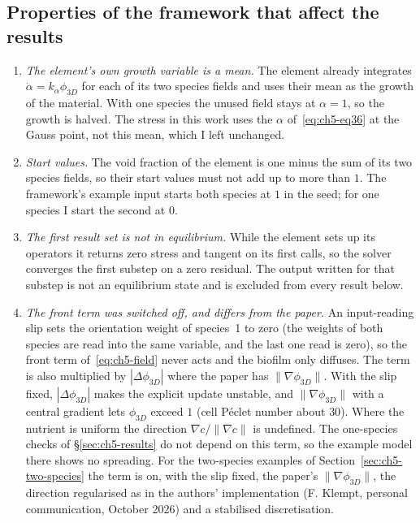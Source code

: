 \subsection{Properties of the framework that affect the results}
\begin{enumerate}
\item \emph{The element's own growth variable is a mean.} The element already
      integrates $\dot\alpha=k_\alpha\phi_{3D}$ for each of its two species fields
      and uses their mean as the growth of the material. With one species the
      unused field stays at $\alpha=1$, so the growth is halved. The stress in this work uses the $\alpha$
      of~\eqref{eq:ch5-eq36} at the Gauss point, not this mean, which I left unchanged.
\item \emph{Start values.} The void fraction of the element is one minus the sum of its two
      species fields, so their start values must not add up to more than $1$. The framework's example
      input starts both species at $1$ in the seed; for one species I start the
      second at $0$.
\item \emph{The first result set is not in equilibrium.} While the element
      sets up its operators it returns zero stress and tangent on its first
      calls, so the solver converges the first substep on a zero residual. The
      output written for that substep is not an equilibrium state and is
      excluded from every result below.
\item \emph{The front term \fterm{} was switched off, and differs from the paper.}
      An input-reading slip sets the orientation weight of species~1 to zero
      (the weights of both species are read into the same variable, and the
      last one read is zero), so the front term of~\eqref{eq:ch5-field} never acts and the biofilm only
      diffuses. The term is also multiplied by $|\Delta\phi_{3D}|$ where the paper has $\|\nabla\phi_{3D}\|$. With the
      slip fixed, $|\Delta\phi_{3D}|$ makes the explicit update unstable, and $\|\nabla\phi_{3D}\|$ with a central
      gradient lets $\phi_{3D}$ exceed $1$ (cell P\'eclet number about $30$). Where the nutrient is uniform the
      direction $\nabla c/\|\nabla c\|$ is undefined. The one-species checks of \S\ref{sec:ch5-results} do
      not depend on this term, so the example model there shows no spreading. For the two-species examples
      of Section~\ref{sec:ch5-two-species} the term is on, with the slip fixed, the paper's
      $\|\nabla\phi_{3D}\|$, the direction regularised as in the authors' implementation (F. Klempt, personal
      communication, October 2026) and a stabilised discretisation.
\end{enumerate}

